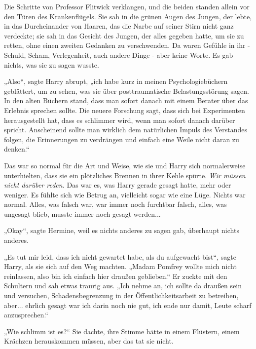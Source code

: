 {Die Schritte von Professor Flitwick verklangen, und die beiden standen allein vor den Türen des Krankenflügels. Sie sah in die grünen Augen des Jungen, der lebte, in das Durcheinander von Haaren, das die Narbe auf seiner Stirn nicht ganz verdeckte; sie sah in das Gesicht des Jungen, der alles gegeben hatte, um sie zu retten, ohne einen zweiten Gedanken zu verschwenden. Da waren Gefühle in ihr - Schuld, Scham, Verlegenheit, auch andere Dinge - aber keine Worte. Es gab nichts, was sie zu sagen wusste.

„Also“, sagte Harry abrupt, „ich habe kurz in meinen Psychologiebüchern geblättert, um zu sehen, was sie über posttraumatische Belastungsstörung sagen. In den alten Büchern stand, dass man sofort danach mit einem Berater über das Erlebnis sprechen sollte. Die neuere Forschung sagt, dass sich bei Experimenten herausgestellt hat, dass es schlimmer wird, wenn man sofort danach darüber spricht. Anscheinend sollte man wirklich dem natürlichen Impuls des Verstandes folgen, die Erinnerungen zu verdrängen und einfach eine Weile nicht daran zu denken.“

Das war so normal für die Art und Weise, wie sie und Harry sich normalerweise unterhielten, dass sie ein plötzliches Brennen in ihrer Kehle spürte. \emph{Wir müssen nicht darüber reden.} Das war es, was Harry gerade gesagt hatte, mehr oder weniger. Es fühlte sich wie Betrug an, vielleicht sogar wie eine Lüge. Nichts war normal. Alles, was falsch war, war immer noch furchtbar falsch, alles, was ungesagt blieb, musste immer noch gesagt werden...

„Okay“, sagte Hermine, weil es nichts anderes zu sagen gab, überhaupt nichts anderes.

„Es tut mir leid, dass ich nicht gewartet habe, als du aufgewacht bist“, sagte Harry, als sie sich auf den Weg machten. „Madam Pomfrey wollte mich nicht reinlassen, also bin ich einfach hier draußen geblieben.“ Er zuckte mit den Schultern und sah etwas traurig aus. „Ich nehme an, ich sollte da draußen sein und versuchen, Schadensbegrenzung in der Öffentlichkeitsarbeit zu betreiben, aber... ehrlich gesagt war ich darin noch nie gut, ich ende nur damit, Leute scharf anzusprechen.“

„Wie schlimm ist es?“ Sie dachte, ihre Stimme hätte in einem Flüstern, einem Krächzen herauskommen müssen, aber das tat sie nicht.

}
